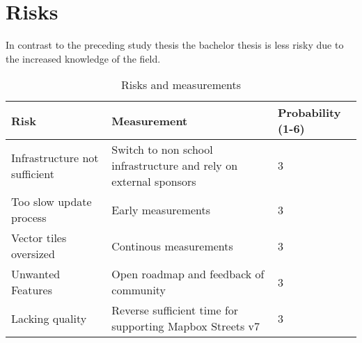 \section{Risks}\label{risks}

In contrast to the preceding study thesis the bachelor thesis is less risky due
to the increased knowledge of the field.

\begin{table}[H]
\centering
    \begin{tabular}{p{4.5cm} p{7.5cm} p{1.8cm}}
    \hline
    Risk & Measurement & Probability (1-6)\\
    \hline
    Infrastructure not sufficient & Switch to non school infrastructure and rely on external sponsors & 3\\
    Too slow update process& Early measurements & 3\\
    Vector tiles oversized & Continous measurements & 3\\
    Unwanted Features & Open roadmap and feedback of community & 3\\
    Lacking quality & Reverse sufficient time for supporting Mapbox Streets v7 & 3\\
    \end{tabular}
    \caption{Risks and measurements}
\end{table}
